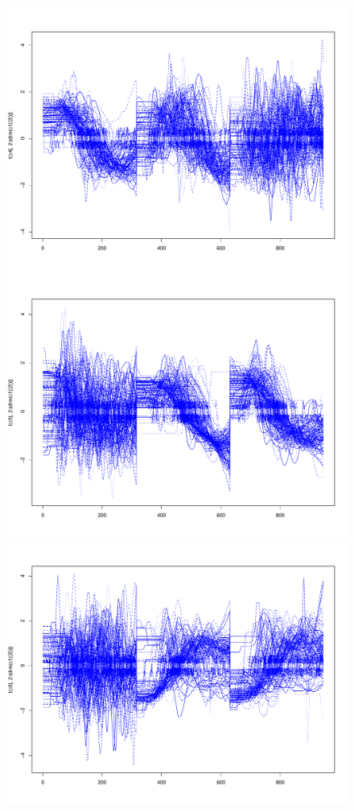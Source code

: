 \begin{figure}[h]
\includegraphics[scale=0.1]{images/c4}
\includegraphics[scale=0.1]{images/c5}
\includegraphics[scale=0.1]{images/c6}

\end{figure}
